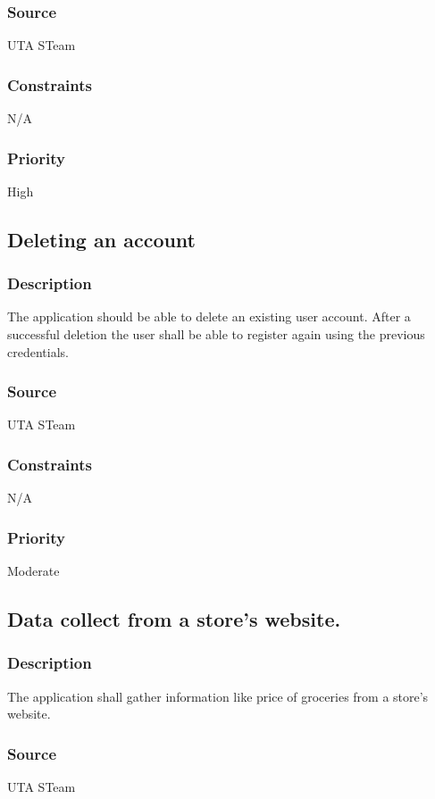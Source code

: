 \subsubsection{Source}
UTA STeam
\subsubsection{Constraints}
N/A
\subsubsection{Priority}
High

\subsection{Deleting an account}
\subsubsection{Description}
The application should be able to delete an existing user account. After a successful deletion the user shall be able to register again using the previous credentials. 
\subsubsection{Source}
UTA STeam
\subsubsection{Constraints}
N/A
\subsubsection{Priority}
Moderate

\subsection{Data collect from a store's website.}
\subsubsection{Description}
The application shall gather information like price of groceries from a store's website.  
\subsubsection{Source}
UTA STeam

